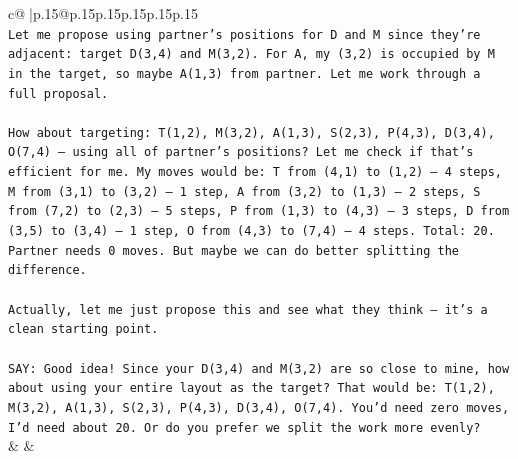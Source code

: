 \documentclass{article}
\begin{document}
{\begin{supertabular}{c@{$\;$}|p{.15\linewidth}@{}p{.15\linewidth}p{.15\linewidth}p{.15\linewidth}p{.15\linewidth}p{.15\linewidth}}
{{{\\ 
\texttt{Let me propose using partner's positions for D and M since they're adjacent: target D(3,4) and M(3,2). For A, my (3,2) is occupied by M in the target, so maybe A(1,3) from partner. Let me work through a full proposal.} \\
\\ 
\texttt{How about targeting: T(1,2), M(3,2), A(1,3), S(2,3), P(4,3), D(3,4), O(7,4) — using all of partner's positions? Let me check if that's efficient for me. My moves would be: T from (4,1) to (1,2) — 4 steps, M from (3,1) to (3,2) — 1 step, A from (3,2) to (1,3) — 2 steps, S from (7,2) to (2,3) — 5 steps, P from (1,3) to (4,3) — 3 steps, D from (3,5) to (3,4) — 1 step, O from (4,3) to (7,4) — 4 steps. Total: 20. Partner needs 0 moves. But maybe we can do better splitting the difference.} \\
\\ 
\texttt{Actually, let me just propose this and see what they think — it's a clean starting point.} \\
\\ 
\texttt{SAY: Good idea! Since your D(3,4) and M(3,2) are so close to mine, how about using your entire layout as the target? That would be: T(1,2), M(3,2), A(1,3), S(2,3), P(4,3), D(3,4), O(7,4). You'd need zero moves, I'd need about 20. Or do you prefer we split the work more evenly?} \\
            }
        }
    }
    & & \\ \\


\end{supertabular}}
\end{document}
